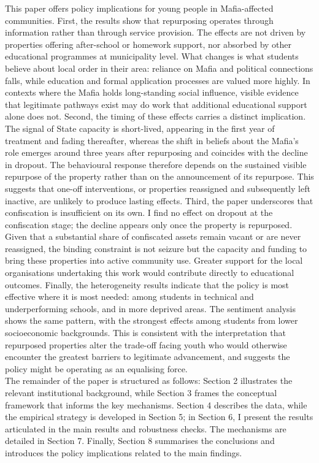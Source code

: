 \documentclass[12pt]{article}
\theoremstyle{plain}
\theoremstyle{plain}
\theoremstyle{plain}
\theoremstyle{definition}
\theoremstyle{plain}
\theoremstyle{definition}
\theoremstyle{plain}
\theoremstyle{remark}
\theoremstyle{definition}
\theoremstyle{definition}
\theoremstyle{plain}
\begin{document}
This paper offers policy implications for young people in Mafia-affected communities. First, the results show that repurposing operates through information rather than through service provision. The effects are not driven by properties offering after-school or homework support, nor absorbed by other educational programmes at municipality level. What changes is what students believe about local order in their area: reliance on Mafia and political connections falls, while education and formal application processes are valued more highly. In contexts where the Mafia holds long-standing social influence, visible evidence that legitimate pathways exist may do work that additional educational support alone does not.
Second, the timing of these effects carries a distinct implication. The signal of State capacity is short-lived, appearing in the first year of treatment and fading thereafter, whereas the shift in beliefs about the Mafia's role emerges around three years after repurposing and coincides with the decline in dropout. The behavioural response therefore depends on the sustained visible repurpose of the property rather than on the announcement of its repurpose. This suggests that one-off interventions, or properties reassigned and subsequently left inactive, are unlikely to produce lasting effects.
Third, the paper underscores that confiscation is insufficient on its own. I find no effect on dropout at the confiscation stage; the decline appears only once the property is repurposed. Given that a substantial share of confiscated assets remain vacant or are never reassigned, the binding constraint is not seizure but the capacity and funding to bring these properties into active community use. Greater support for the local organisations undertaking this work would contribute directly to educational outcomes.
Finally, the heterogeneity results indicate that the policy is most effective where it is most needed: among students in technical and underperforming schools, and in more deprived areas. The sentiment analysis shows the same pattern, with the strongest effects among students from lower socioeconomic backgrounds. This is consistent with the interpretation that repurposed properties alter the trade-off facing youth who would otherwise encounter the greatest barriers to legitimate advancement, and suggests the policy might be operating as an equalising force. \\

The remainder of the paper is structured as follows: Section 2 illustrates the relevant institutional background, while Section 3 frames the conceptual framework that informs the key mechanisms. Section 4 describes the data, while the empirical strategy is developed in Section 5; in Section 6, I present the results articulated in the main results and robustness checks. The mechanisms are detailed in Section 7. Finally, Section 8 summarises the conclusions and introduces the policy implications related to the main findings. \par
\end{document}
